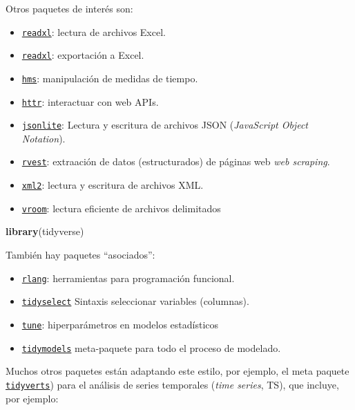 \documentclass[
]{book}
\newenvironment{Shaded}{\begin{snugshade}}{\end{snugshade}}
\newcommand{\FunctionTok}[1]{\textcolor[rgb]{0.13,0.29,0.53}{\textbf{#1}}}
\newcommand{\NormalTok}[1]{#1}
\providecommand{\tightlist}{%
  \setlength{\itemsep}{0pt}\setlength{\parskip}{0pt}}
\begin{document}
Otros paquetes de interés son:

\begin{itemize}
\tightlist
\item
  \href{https://github.com/tidyverse/readxl}{\texttt{readxl}}: lectura de archivos Excel.
\item
  \href{https://github.com/ropensci/writexl}{\texttt{readxl}}: exportación a Excel.
\item
  \href{https://github.com/tidyverse/hms}{\texttt{hms}}: manipulación de medidas de tiempo.
\item
  \href{https://github.com/r-lib/httr}{\texttt{httr}}: interactuar con web APIs.
\item
  \href{https://github.com/jeroen/jsonlite}{\texttt{jsonlite}}: Lectura y escritura de archivos JSON (\emph{JavaScript Object Notation}).
\item
  \href{https://github.com/tidyverse/rvest}{\texttt{rvest}}: extraación de datos (estructurados) de páginas web \emph{web scraping}.
\item
  \href{https://github.com/r-lib/xml2}{\texttt{xml2}}: lectura y escritura de archivos XML.
\item
  \href{https://github.com/tidyverse/vroom}{\texttt{vroom}}: lectura eficiente de archivos delimitados
\end{itemize}

\begin{Shaded}
\begin{Highlighting}[]
\FunctionTok{library}\NormalTok{(tidyverse)}
\end{Highlighting}
\end{Shaded}

También hay paquetes ``asociados'':

\begin{itemize}
\tightlist
\item
  \href{https://rlang.r-lib.org}{\texttt{rlang}}: herramientas para programación funcional.
\item
  \href{https://tidyselect.r-lib.org}{\texttt{tidyselect}} Sintaxis seleccionar variables (columnas).
\item
  \href{https://tune.tidymodels.org/}{\texttt{tune}}: hiperparámetros en modelos estadísticos
\item
  \href{https://tidymodels.tidymodels.org}{\texttt{tidymodels}} meta-paquete para todo el proceso de modelado.
\end{itemize}

Muchos otros paquetes están adaptando este estilo, por ejemplo, el meta paquete \href{https://tidyverts.org/}{\texttt{tidyverts}}) para el análisis de series temporales (\emph{time series}, TS), que incluye, por ejemplo:
\end{document}
